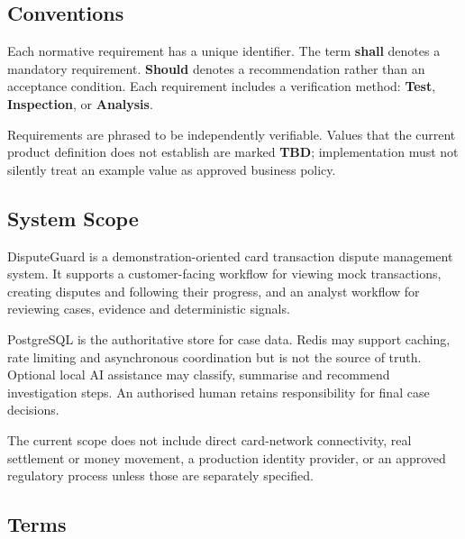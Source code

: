 \documentclass[11pt,a4paper]{article}
\begin{document}
\subsection{Conventions}

Each normative requirement has a unique identifier. The term
\textbf{shall} denotes a mandatory requirement. \textbf{Should}
denotes a recommendation rather than an acceptance condition. Each
requirement includes a verification method: \textbf{Test},
\textbf{Inspection}, or \textbf{Analysis}.

Requirements are phrased to be independently verifiable. Values that
the current product definition does not establish are marked
\textbf{TBD}; implementation must not silently treat an example value
as approved business policy.

\subsection{System Scope}

DisputeGuard is a demonstration-oriented card transaction dispute
management system. It supports a customer-facing workflow for viewing
mock transactions, creating disputes and following their progress, and
an analyst workflow for reviewing cases, evidence and deterministic
signals.

PostgreSQL is the authoritative store for case data. Redis may support
caching, rate limiting and asynchronous coordination but is not the
source of truth. Optional local AI assistance may classify, summarise
and recommend investigation steps. An authorised human retains
responsibility for final case decisions.

The current scope does not include direct card-network connectivity,
real settlement or money movement, a production identity provider, or
an approved regulatory process unless those are separately specified.

\subsection{Terms}
\end{document}

